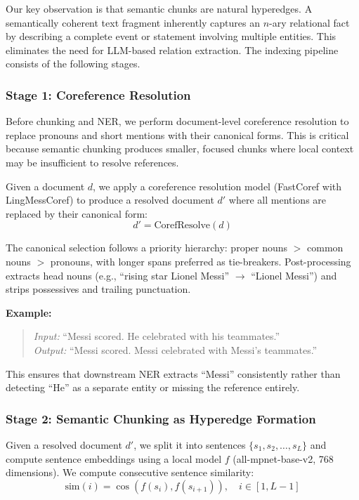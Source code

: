 \documentclass[11pt,a4paper]{article}
\begin{document}
Our key observation is that semantic chunks are natural hyperedges. A semantically coherent text fragment inherently captures an $n$-ary relational fact by describing a complete event or statement involving multiple entities. This eliminates the need for LLM-based relation extraction. The indexing pipeline consists of the following stages.

\subsubsection{Stage 1: Coreference Resolution}

Before chunking and NER, we perform document-level coreference resolution to replace pronouns and short mentions with their canonical forms. This is critical because semantic chunking produces smaller, focused chunks where local context may be insufficient to resolve references.

Given a document $d$, we apply a coreference resolution model (FastCoref with LingMessCoref) to produce a resolved document $d'$ where all mentions are replaced by their canonical form:
\begin{equation}
    d' = \text{CorefResolve}(d)
\end{equation}

The canonical selection follows a priority hierarchy: proper nouns $>$ common nouns $>$ pronouns, with longer spans preferred as tie-breakers. Post-processing extracts head nouns (e.g., ``rising star Lionel Messi'' $\to$ ``Lionel Messi'') and strips possessives and trailing punctuation.

\textbf{Example:}
\begin{quote}
    \textit{Input:} ``Messi scored. He celebrated with his teammates.'' \\
    \textit{Output:} ``Messi scored. Messi celebrated with Messi's teammates.''
\end{quote}

This ensures that downstream NER extracts ``Messi'' consistently rather than detecting ``He'' as a separate entity or missing the reference entirely.

\subsubsection{Stage 2: Semantic Chunking as Hyperedge Formation}

Given a resolved document $d'$, we split it into sentences $\{s_1, s_2, \ldots, s_L\}$ and compute sentence embeddings using a local model $f$ (all-mpnet-base-v2, 768 dimensions). We compute consecutive sentence similarity:
\begin{equation}
    \text{sim}(i) = \cos(f(s_i), f(s_{i+1})), \quad i \in [1, L-1]
\end{equation}
\end{document}
